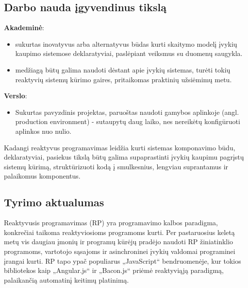 \subsection{Darbo nauda įgyvendinus tikslą}

\textbf{Akademinė}:

\begin{itemize}
  \item sukurtas inovatyvus arba alternatyvus būdas kurti skaitymo modelį įvykių kaupimo sistemose deklaratyviai, paslėpiant veiksmus su duomenų saugykla.
  \item medžiagą būtų galima naudoti dėstant apie įvykių sistemas, turėti  tokių reaktyvių sistemų kūrimo gaires, pritaikomas praktinių užsiėmimų metu.
\end{itemize}

\textbf{Verslo}:

\begin{itemize}
  \item Sukurtas pavyzdinis projektas, paruoštas naudoti gamybos aplinkoje (angl. production environment) - sutaupytų daug laiko, nes nereikėtų konfigūruoti aplinkos nuo nulio.
\end{itemize}

Kadangi reaktyvus programavimas leidžia kurti sistemas komponavimo būdu, deklaratyviai, pasiekus tikslą būtų galima supaprastinti įvykių kaupimu pagrįstų sistemų kūrimą, struktūrizuoti kodą į smulkesnius, lengviau suprantamus ir palaikomus komponentus.


\subsection{Tyrimo aktualumas}

Reaktyvusis programavimas (RP) yra programavimo kalbos paradigma, konkrečiai taikoma reaktyviosioms programoms kurti. Per pastaruosius keletą metų vis daugiau įmonių ir programų kūrėjų pradėjo naudoti RP žiniatinklio programoms, vartotojo sąsajoms ir asinchroninei įvykių valdomai programinei įrangai kurti. RP tapo ypač populiarus „JavaScript“ bendruomenėje, kur tokios bibliotekos kaip „Angular.js“ ir „Bacon.js“ priėmė reaktyviąją paradigmą, palaikančią automatinį keitimų platinimą.

